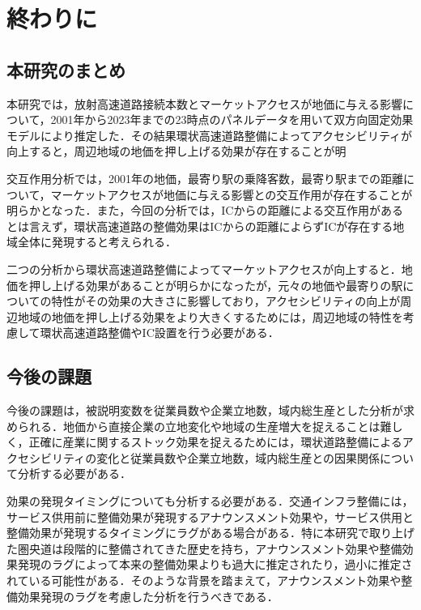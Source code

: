 \chapter{終わりに}

\section{本研究のまとめ}
本研究では，放射高速道路接続本数とマーケットアクセスが地価に与える影響について，2001年から2023年までの23時点のパネルデータを用いて双方向固定効果モデルにより推定した．その結果環状高速道路整備によってアクセシビリティが向上すると，周辺地域の地価を押し上げる効果が存在することが明

交互作用分析では，2001年の地価，最寄り駅の乗降客数，最寄り駅までの距離について，マーケットアクセスが地価に与える影響との交互作用が存在することが明らかとなった．また，今回の分析では，ICからの距離による交互作用があるとは言えず，環状高速道路の整備効果はICからの距離によらずICが存在する地域全体に発現すると考えられる．

二つの分析から環状高速道路整備によってマーケットアクセスが向上すると．地価を押し上げる効果があることが明らかになったが，元々の地価や最寄りの駅についての特性がその効果の大きさに影響しており，アクセシビリティの向上が周辺地域の地価を押し上げる効果をより大きくするためには，周辺地域の特性を考慮して環状高速道路整備やIC設置を行う必要がある．
\section{今後の課題}
今後の課題は，被説明変数を従業員数や企業立地数，域内総生産とした分析が求められる．地価から直接企業の立地変化や地域の生産増大を捉えることは難しく，正確に産業に関するストック効果を捉えるためには，環状道路整備によるアクセシビリティの変化と従業員数や企業立地数，域内総生産との因果関係について分析する必要がある．

効果の発現タイミングについても分析する必要がある．交通インフラ整備には，サービス供用前に整備効果が発現するアナウンスメント効果や，サービス供用と整備効果が発現するタイミングにラグがある場合がある．特に本研究で取り上げた圏央道は段階的に整備されてきた歴史を持ち，アナウンスメント効果や整備効果発現のラグによって本来の整備効果よりも過大に推定されたり，過小に推定されている可能性がある．そのような背景を踏まえて，アナウンスメント効果や整備効果発現のラグを考慮した分析を行うべきである．

